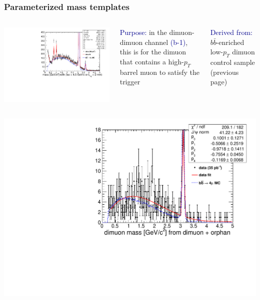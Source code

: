 \documentclass[compress]{beamer}
\begin{document}
\begin{frame}
\frametitle{Parameterized mass templates}

\begin{columns}
\includegraphics[width=\linewidth]{lowdimuon_mass_bcuts_backgroundfit_zoom.pdf}

\textcolor{darkblue}{Purpose:} in the dimuon-dimuon channel \textcolor{darkblue}{(b-1)}, this is for the dimuon that contains a high-$p_T$ barrel muon to satisfy the trigger

\textcolor{darkblue}{Derived from:} $b\bar{b}$-enriched low-$p_T$ dimuon control sample (previous page)
\end{columns}

\begin{columns}
\includegraphics[width=\linewidth]{dimuorphan_mass_fit_zoom.pdf}


\end{columns}
\end{frame}
\end{document}
